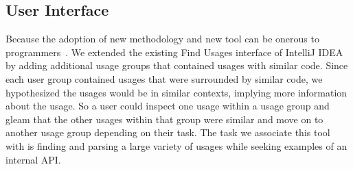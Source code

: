\documentclass[conference]{IEEEtran}
\begin{document}
\subsection{User Interface} 

Because the adoption of new methodology and new tool can be onerous to programmers~\cite{adaption2002}. We extended the existing Find Usages interface of IntelliJ IDEA by adding additional usage groups that contained usages with similar code. Since each user group contained usages that were surrounded by similar code, we hypothesized the usages would be in similar contexts, implying more information about the usage. So a user could inspect one usage within a usage group and gleam that the other usages within that group were similar and move on to another usage group depending on their task. The task we associate this tool with is finding and parsing a large variety of usages while seeking examples of an internal API.
\end{document}
